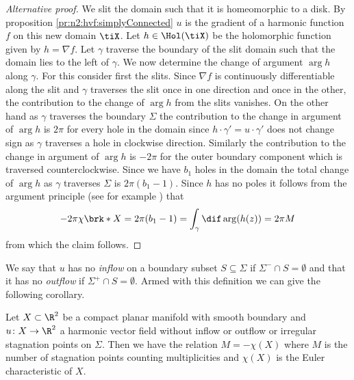 \begin{proof}[Alternative proof]
  We slit the domain such that it is homeomorphic to a disk. By proposition \ref{pr:n2:hvf:simplyConnected} $u$ is the gradient of a
  harmonic function $f$ on this new domain $\tiX$. Let $h\in\Hol(\tiX)$ be the holomorphic function given by $h=\nabla f$.
  Let $\gamma$ traverse the boundary of the slit domain such that the domain lies to the left of $\gamma$.
  We now determine the change of argument $\arg h$ along $\gamma$. For this
  consider first the slits. Since $\nabla f$ is continuously differentiable
  along the slit and $\gamma$ traverses the slit once in one direction and once in the other,
  the contribution to the change of $\arg h$ from the slits vanishes.
  On the other hand as $\gamma$ traverses the boundary $\Sigma$ the contribution to the change in
  argument of $\arg h$ is $2\pi$ for every hole in the domain 
  since $h\cdot\gamma'=u\cdot\gamma'$ does not change sign as $\gamma$ traverses a hole in clockwise direction.
  Similarly the contribution to the change in argument of $\arg h$ is $-2\pi$ for the outer boundary component
  which is traversed counterclockwise.
  Since we have $b_1$ holes in the domain the total change of $\arg h$ as $\gamma$ traverses $\Sigma$ is
  $2\pi(b_1-1)$.
  Since $h$ has no poles it follows from the argument principle (see for example \cite[Chapter VIII]{Gamelin2001}) that
  \begin{align*}
    -2\pi\chi\brk*{X}=2\pi(b_1-1)=\int_\gamma\dif\arg (h(z)) =  2\pi M
  \end{align*}
  from which the claim follows.
\end{proof}

We say that $u$ has no \emph{inflow} on a boundary subset $S\subseteq\Sigma$ if $\Sigma^-\cap S=\emptyset$ and
that it has no \emph{outflow} if $\Sigma^+\cap S=\emptyset$.
Armed with this definition we can give the following corollary.
\begin{corollary}[No in- or outflow]\label{co:n2_noInflowNoOutflow}
  Let $X\subset\R^2$ be a compact planar manifold with smooth boundary and $u\colon X\to\R^2$ a
  harmonic vector field without inflow or outflow 
  or irregular stagnation points on $\Sigma$. Then we have the relation $M=-\chi(X)$ where $M$ is the number of stagnation points counting multiplicities
  and $\chi(X)$ is the Euler characteristic of $X$.
\end{corollary}

